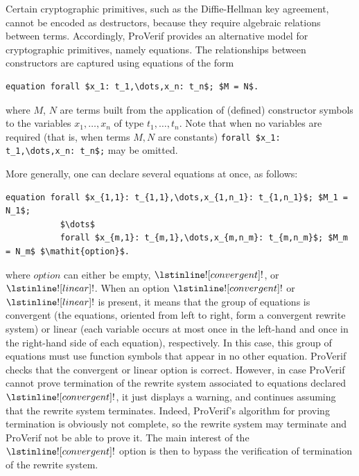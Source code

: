 \documentclass{book}
\begin{document}

Certain cryptographic primitives, such as the Diffie-Hellman key
agreement, cannot be encoded as destructors, because they require
algebraic relations between terms.  Accordingly, ProVerif provides an
alternative model for cryptographic primitives, namely equations.
%
The relationships between constructors are captured using equations of the form
\begin{lstlisting}[numbers=none]
	equation forall $x_1: t_1,\dots,x_n: t_n$; $M = N$.
\end{lstlisting}
where $M$, $N$ are terms built from the application of (defined) constructor symbols to the variables $x_1,\dots,x_n$ of type $t_1,\dots,t_n$. Note that when no variables are required (that is, when terms $M,N$ are constants) \lstinline!forall $x_1: t_1,\dots,x_n: t_n$;! may be omitted.

More generally, one can declare several equations at once, as follows:
\begin{lstlisting}[numbers=none]
	equation forall $x_{1,1}: t_{1,1},\dots,x_{1,n_1}: t_{1,n_1}$; $M_1 = N_1$;
           $\dots$
           forall $x_{m,1}: t_{m,1},\dots,x_{m,n_m}: t_{m,n_m}$; $M_m = N_m$ $\mathit{option}$.
\end{lstlisting}
where $\mathit{option}$ can either be empty, $\lstinline![convergent]!$,
or $\lstinline![linear]!$. When an option $\lstinline![convergent]!$
or $\lstinline![linear]!$ is present, it means that the group of equations
is convergent (the equations, oriented from left to right, form a
convergent rewrite system) or linear (each variable occurs at most once
in the left-hand and once in the right-hand side of each equation),
respectively. In this case, this group of equations must use function symbols
that appear in no other equation. ProVerif checks that the convergent
or linear option is correct. However, in case ProVerif cannot prove
termination of the rewrite system associated to equations declared
$\lstinline![convergent]!$, it just displays a warning, and continues
assuming that the rewrite system terminates. Indeed, ProVerif's algorithm
for proving termination is obviously not complete, so the rewrite system
may terminate and ProVerif not be able to prove it. The main interest
of the $\lstinline![convergent]!$ option is then to bypass the
verification of termination of the rewrite system.
\end{document}
